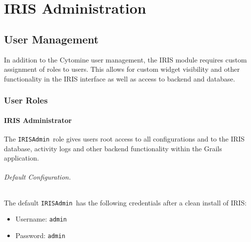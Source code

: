 \part{IRIS Administration}
\label{part:irisadmin}
{
\hypersetup{linkcolor=black}
\parttoc
}

\chapter{User Management}
In addition to the Cytomine user management, the IRIS module requires custom assignment of roles to users. 
This allows for custom widget visibility and other functionality in the IRIS interface as well as access to backend and database. 

\def\irisadmin{\texttt{IRISAdmin}}
\def\pjcoord{\texttt{ProjectCoordinator}}

\section{User Roles}
\subsection{IRIS Administrator}
The \irisadmin\ role gives users root access to all configurations and to the IRIS database, activity logs and other backend functionality within the Grails application.  

\noindent 

\paragraph{Default Configuration.} 
The default \irisadmin\ has the following credentials after a clean install of IRIS:
\begin{itemize}
\item Username: \texttt{admin}
\item Password: \texttt{admin}
\end{itemize}


